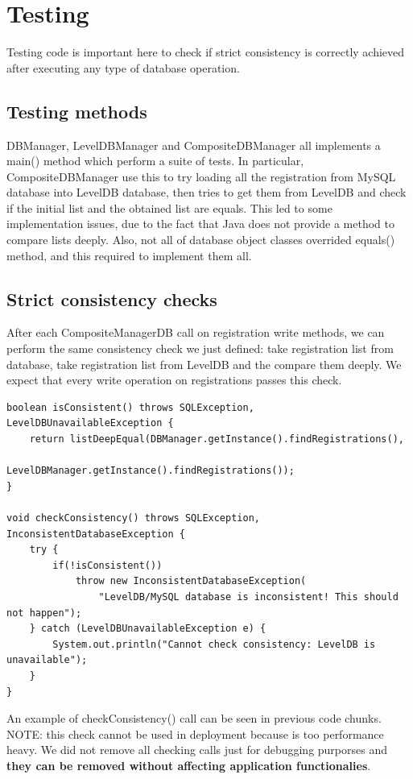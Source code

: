 \documentclass{report}
\begin{document}
\section*{Testing}
Testing code is important here to check if strict consistency is correctly achieved after executing any type of database operation.

\subsection*{Testing methods}
DBManager, LevelDBManager and CompositeDBManager all implements a main() method which perform a suite of tests. In particular, CompositeDBManager use this to try loading all the registration from MySQL database into LevelDB database, then tries to get them from LevelDB and check if the initial list and the obtained list are equals. This led to some implementation issues, due to the fact that Java does not provide a method to compare lists deeply. Also, not all of database object classes overrided equals() method, and this required to implement them all.

\subsection*{Strict consistency checks}
After each CompositeManagerDB call on registration write methods, we can perform the same consistency check we just defined: take registration list from database, take registration list from LevelDB and the compare them deeply. We expect that every write operation on registrations passes this check.
\begin{lstlisting}
boolean isConsistent() throws SQLException, LevelDBUnavailableException {
    return listDeepEqual(DBManager.getInstance().findRegistrations(),
    						LevelDBManager.getInstance().findRegistrations());
}

void checkConsistency() throws SQLException, InconsistentDatabaseException {
    try {
        if(!isConsistent())
            throw new InconsistentDatabaseException(
            	"LevelDB/MySQL database is inconsistent! This should not happen");
    } catch (LevelDBUnavailableException e) {
        System.out.println("Cannot check consistency: LevelDB is unavailable");
    }
}
\end{lstlisting}
An example of checkConsistency() call can be seen in previous code chunks.\\
NOTE: this check cannot be used in deployment because is too performance heavy. We did not remove all checking calls just for debugging purporses and \textbf{they can be removed without affecting application functionalies}.
\end{document}
